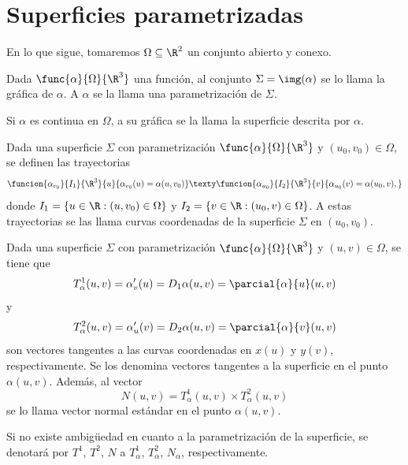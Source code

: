 \documentclass[a4,11pt]{aleph-notas}
\begin{document}
\encabezado

\section{Superficies parametrizadas}

En lo que sigue, tomaremos $\Omega\subseteq \R^2$ un conjunto abierto y conexo.

\begin{defi}
    Dada $\func{\alpha}{\Omega}{\R^3}$ una función, al conjunto $\Sigma=\img(\alpha)$ se lo llama la gráfica de $\alpha$. A $\alpha$ se la llama una parametrización de $\Sigma$.

    Si $\alpha$ es continua en $\Omega$, a su gráfica se la llama la superficie descrita por $\alpha$.
\end{defi}

\begin{defi}
    Dada una superficie $\Sigma$ con parametrización $\func{\alpha}{\Omega}{\R^3}$ y $(u_0,v_0)\in \Omega$, se definen las trayectorias
    \[
        \funcion{\alpha_{v_0}}{I_1}{\R^3}{u}{\alpha_{v_0}(u)=\alpha(u,v_0)}
        \texty
        \funcion{\alpha_{u_0}}{I_2}{\R^3}{v}{\alpha_{u_0}(v)=\alpha(u_0,v),}
    \]
    donde $I_1=\{u\in\R:(u,v_0)\in \Omega\}$ y $I_2=\{v\in\R:(u_0,v)\in \Omega\}$. A estas trayectorias se las llama curvas coordenadas de la superficie $\Sigma$ en $(u_0,v_0)$.
\end{defi}

\begin{defi}
    Dada una superficie $\Sigma$ con parametrización $\func{\alpha}{\Omega}{\R^3}$ y $(u,v)\in \Omega$, se tiene que
    \[
        T_\alpha^1(u,v) = \alpha_v'(u) = D_1 \alpha(u,v) = \parcial{\alpha}{u}(u,v)
    \]
    y
    \[
        T_\alpha^2(u,v) = \alpha_u'(v) = D_2 \alpha(u,v) = \parcial{\alpha}{v}(u,v)
    \]
    son vectores tangentes a las curvas coordenadas en $x(u)$ y $y(v)$, respectivamente. Se los denomina vectores tangentes a la superficie en el punto $\alpha(u,v)$. Además, al vector
    \[
        N(u,v) = T_\alpha^1(u,v) \times T_\alpha^2(u,v)
    \]
    se lo llama vector normal estándar en el punto $\alpha(u,v)$.
\end{defi}

\begin{advertencia}
    Si no existe ambigüedad en cuanto a la parametrización de la superficie, se denotará por $T^1$, $T^2$, $N$ a $T_\alpha^1$, $T_\alpha^2$, $N_\alpha$, respectivamente.
\end{advertencia}
\end{document}
